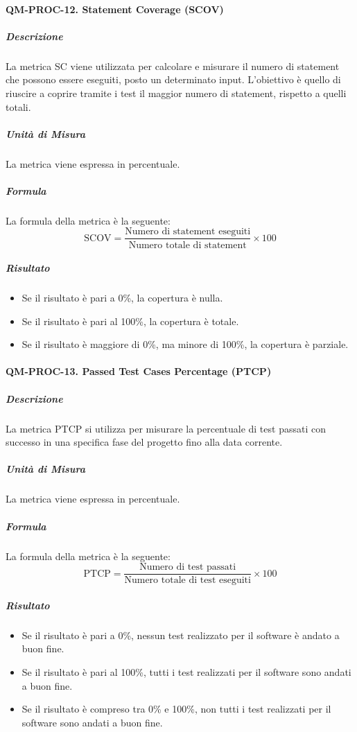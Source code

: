 		\paragraph{QM-PROC-12. Statement Coverage (SCOV)}

			\subparagraph{Descrizione}
			La metrica SC viene utilizzata per calcolare e misurare il numero di statement che possono essere eseguiti, posto un determinato input. L'obiettivo è quello di riuscire a coprire tramite i test il maggior numero di statement, rispetto a quelli totali.

			\subparagraph{Unità di Misura}
			La metrica viene espressa in percentuale.

			\subparagraph{Formula}
			La formula della metrica è la seguente:
			\[
				\text{SCOV} = \frac{\text{Numero di statement eseguiti}}{\text{Numero totale di statement}} \times 100
			\]

			\subparagraph{Risultato}
			\begin{itemize}
				\item Se il risultato è pari a 0\%, la copertura è nulla.
				\item Se il risultato è pari al 100\%, la copertura è totale.
				\item Se il risultato è maggiore di 0\%, ma minore di 100\%, la copertura è parziale.
			\end{itemize}

		\paragraph{QM-PROC-13. Passed Test Cases Percentage (PTCP)}

			\subparagraph{Descrizione}
			La metrica PTCP si utilizza per misurare la percentuale di test passati con successo in una specifica fase del progetto fino alla data corrente. 

			\subparagraph{Unità di Misura}
			La metrica viene espressa in percentuale.

			\subparagraph{Formula}
			La formula della metrica è la seguente:
			\[
				\text{PTCP} = \frac{\text{Numero di test passati}}{\text{Numero totale di test eseguiti}} \times 100
			\]

			\subparagraph{Risultato}
			\begin{itemize}
				\item Se il risultato è pari a 0\%, nessun test realizzato per il software è andato a buon fine.
				\item Se il risultato è pari al 100\%, tutti i test realizzati per il software sono andati a buon fine.
				\item Se il risultato è compreso tra 0\% e 100\%, non tutti i test realizzati per il software sono andati a buon fine.
			\end{itemize}

